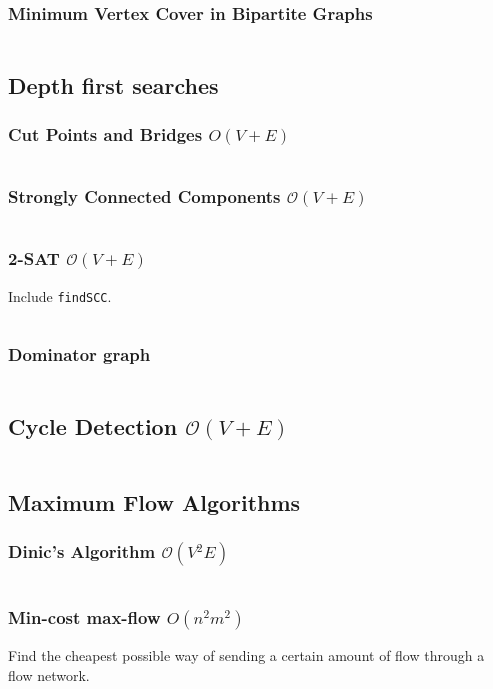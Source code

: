 \documentclass[8pt,a4paper,landscape,oneside]{amsart}
\newcommand{\mintedstyle}[2]{\inputminted[fontsize=\normalsize,baselinestretch=.9,breaklines,tabsize=2]{#1}{code/#2}}
\newcommand{\code}[1]{\mintedstyle{cpp}{#1}}
\begin{document}
\begin{multicols*}{3}
\subsubsection{Minimum Vertex Cover in Bipartite Graphs}
\code{graphs/bipartite_mvc.cpp}

\subsection{Depth first searches}

\subsubsection{Cut Points and Bridges $O(V+E)$}
\code{graphs/cut_points_and_bridges.cpp}

\subsubsection{Strongly Connected Components $\mathcal{O}(V + E)$}
\code{graphs/scc.cpp}

\subsubsection{2-SAT $\mathcal{O}(V+E)$}
Include \texttt{findSCC}.
\code{satsolver.cpp}

\subsubsection{Dominator graph}
\code{graphs/dominator.cpp}

\subsection{Cycle Detection $\mathcal{O}(V + E)$}
\code{findcycle.cpp}

\subsection{Maximum Flow Algorithms}
\subsubsection{Dinic's Algorithm $\mathcal{O}(V^{2} E)$}
\code{graphs/dinic.cpp}

\subsubsection{Min-cost max-flow $O(n^2 m^2)$}
Find the cheapest possible way of sending a certain amount of flow through a flow network.
\code{graphs/mincostmaxflow.cpp}


\end{multicols*}
\end{document}
